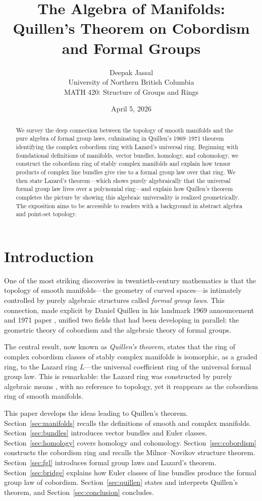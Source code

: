 \documentclass[12pt]{article}
\title{The Algebra of Manifolds:\\
       Quillen's Theorem on Cobordism and Formal Groups}
\author{Deepak Jassal\\
  \small University of Northern British Columbia\\
  \small MATH 420: Structure of Groups and Rings}
\date{April 5, 2026}
\theoremstyle{definition}
\theoremstyle{remark}
\begin{document}
\maketitle

\begin{abstract}
We survey the deep connection between the topology of smooth manifolds and the pure algebra of formal group laws, culminating in Quillen's 1969--1971 theorem identifying the complex cobordism ring with Lazard's universal ring. Beginning with foundational definitions of manifolds, vector bundles, homology, and cohomology, we construct the cobordism ring of stably complex manifolds and explain how tensor products of complex line bundles give rise to a formal group law over that ring. We then state Lazard's theorem---which shows purely algebraically that the universal formal group law lives over a polynomial ring---and explain how Quillen's theorem completes the picture by showing this algebraic universality is realized geometrically. The exposition aims to be accessible to readers with a background in abstract algebra and point-set topology.
\end{abstract}

\tableofcontents
\newpage

\section{Introduction}

One of the most striking discoveries in twentieth-century mathematics is that the topology of smooth manifolds---the geometry of curved spaces---is intimately controlled by purely algebraic structures called \emph{formal group laws}. This connection, made explicit by Daniel Quillen in his landmark 1969 announcement \cite{Qui69} and 1971 paper \cite{Qui71}, unified two fields that had been developing in parallel: the geometric theory of cobordism and the algebraic theory of formal groups.

The central result, now known as \emph{Quillen's theorem}, states that the ring of complex cobordism classes of stably complex manifolds is isomorphic, as a graded ring, to the Lazard ring $L$---the universal coefficient ring of the universal formal group law. This is remarkable: the Lazard ring was constructed by purely algebraic means \cite{Laz55}, with no reference to topology, yet it reappears as the cobordism ring of smooth manifolds.

This paper develops the ideas leading to Quillen's theorem. Section~\ref{sec:manifolds} recalls the definitions of smooth and complex manifolds. Section~\ref{sec:bundles} introduces vector bundles and Euler classes. Section~\ref{sec:homology} covers homology and cohomology. Section~\ref{sec:cobordism} constructs the cobordism ring and recalls the Milnor--Novikov structure theorem. Section~\ref{sec:fgl} introduces formal group laws and Lazard's theorem. Section~\ref{sec:bridge} explains how Euler classes of line bundles produce the formal group law of cobordism. Section~\ref{sec:quillen} states and interprets Quillen's theorem, and Section~\ref{sec:conclusion} concludes.
\end{document}
